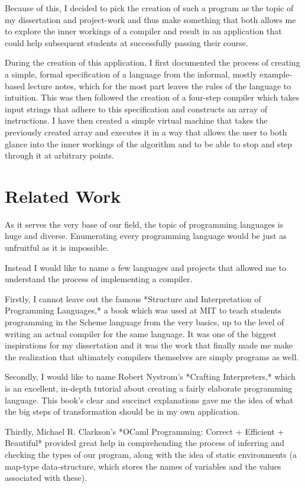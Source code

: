 \documentclass[conference]{IEEEtran}
\begin{document}
Because of this, I decided to pick the creation of such a program as the topic of my dissertation and project-work and thus make something that both allows me to explore the inner workings of a compiler and result in an application that could help subsequent students at successfully passing their course.

During the creation of this application, I first documented the process of creating a simple, formal specification of a language from the informal, mostly example-based lecture notes, which for the most part leaves the rules of the language to intuition. This was then followed the creation of a four-step compiler which takes input strings that adhere to this specification and constructs an array of instructions. I have then created a simple virtual machine that takes the previously created array and executes it in a way that allows the user to both glance into the inner workings of the algorithm and to be able to stop and step through it at arbitrary points.

\section{Related Work}

As it serves the very base of our field, the topic of programming languages is huge and diverse. Enumerating every programming language would be just as unfruitful as it is impossible.

Instead I would like to name a few languages and projects that allowed me to understand the process of implementing a compiler.

Firstly, I cannot leave out the famous *Structure and Interpretation of Programming Languages,* a book which was used at MIT to teach students programming in the Scheme language from the very basics, up to the level of writing an actual compiler for the same language. It was one of the biggest inspirations for my dissertation and it was the work that finally made me make the realization that ultimately compilers themselves are simply programs as well.

Secondly, I would like to name Robert Nystrom's *Crafting Interpreters,* which is an excellent, in-depth tutorial about creating a fairly elaborate programming language. This book's clear and succinct explanations gave me the idea of what the big steps of transformation should be in my own application.

Thirdly, Michael R. Clarkson's *OCaml Programming: Correct + Efficient + Beautiful* provided great help in comprehending the process of inferring and checking the types of our program, along with the idea of static environments (a map-type data-structure, which stores the names of variables and the values associated with these).
\end{document}
